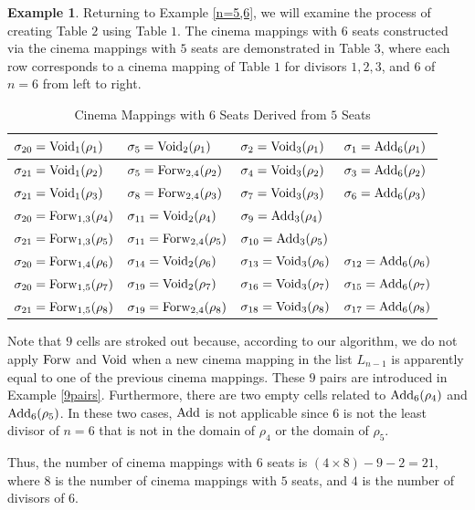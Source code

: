 \documentclass{amsart}
\theoremstyle{definition}
\newtheorem{example}[theorem]{Example}
\begin{document}
\begin{example}
Returning to Example \ref{n=5,6}, we will examine the process of creating Table $2$ using Table $1$. The cinema mappings with $6$ seats constructed via the cinema mappings with $5$ seats are demonstrated in Table $3$, where each row corresponds to a cinema mapping of Table $1$ for divisors $1, 2, 3$, and $6$ of $n=6$ from left to right.

\begin{table}[H]
\centering
\begin{tabular}{| l | l | l | l | }
\hline
$\sigma_{20}={\rm Void}_1(\rho_1)$ &
$\sigma_5={\rm Void}_2(\rho_1)$ &
$\sigma_2={\rm Void}_3(\rho_1)$ &
$\sigma_1={\rm Add}_6(\rho_1)$ \\
\hline
$\sigma_{21}={\rm Void}_1(\rho_2)$ &  
\st{$\sigma_5={\rm Forw}_{2,4}(\rho_2)$} & 
$\sigma_4={\rm Void}_3(\rho_2)$ &
$\sigma_3={\rm Add}_6(\rho_2)$ \\
\hline
\st{$\sigma_{21}={\rm Void}_1(\rho_3)$} & 
$\sigma_8={\rm Forw}_{2,4}(\rho_3)$ & 
$\sigma_7={\rm Void}_3(\rho_3)$ &
$\sigma_6={\rm Add}_6(\rho_3)$ \\
\hline
\st{$\sigma_{20}={\rm Forw}_{1,3}(\rho_4)$} & 
$\sigma_{11}={\rm Void}_2(\rho_4)$ &
$\sigma_9={\rm Add}_3(\rho_4)$ & 
 \\ 
\hline
\st{$\sigma_{21}={\rm Forw}_{1,3}(\rho_5)$} & 
\st{$\sigma_{11}={\rm Forw}_{2,4}(\rho_5)$} & 
$\sigma_{10}={\rm Add}_3(\rho_5)$ & 
  \\ 
\hline
\st{$\sigma_{20}={\rm Forw}_{1,4}(\rho_6)$} & 
$\sigma_{14}={\rm Void}_2(\rho_6)$ & 
$\sigma_{13}={\rm Void}_3(\rho_6)$ & 
$\sigma_{12}={\rm Add}_6(\rho_6)$ \\
\hline
\st{$\sigma_{20}={\rm Forw}_{1,5}(\rho_7)$} & 
$\sigma_{19}={\rm Void}_2(\rho_7)$ & 
$\sigma_{16}={\rm Void}_3(\rho_7)$ & 
$\sigma_{15}={\rm Add}_6(\rho_7)$ \\
\hline
\st{$\sigma_{21}={\rm Forw}_{1,5}(\rho_8)$} & 
\st{$\sigma_{19}={\rm Forw}_{2,4}(\rho_8)$} & 
$\sigma_{18}={\rm Void}_3(\rho_8)$ & 
$\sigma_{17}={\rm Add}_6(\rho_8)$ \\
\hline 
\end{tabular}
\caption{Cinema Mappings with $6$ Seats Derived from $5$ Seats}
\end{table}

Note that $9$ cells are stroked out because, according to our algorithm, we do not apply ${\rm Forw}$ and ${\rm Void}$ when a new cinema mapping in the list $L_{n-1}$ is apparently equal to one of the previous cinema mappings. These $9$ pairs are introduced in Example \ref{9pairs}. Furthermore, there are two empty cells related to ${\rm Add}_6(\rho_4)$ and ${\rm Add}_6(\rho_5)$. In these two cases, ${\rm Add}$ is not applicable since $6$ is not the least divisor of $n=6$ that is not in the domain of $\rho_4$ or the domain of $\rho_5$.

Thus, the number of cinema mappings with $6$ seats is $(4 \times 8) - 9 - 2 = 21$, where $8$ is the number of cinema mappings with $5$ seats, and $4$ is the number of divisors of $6$.
\end{example}
\end{document}
